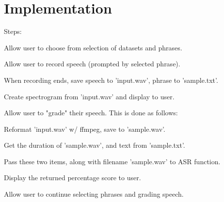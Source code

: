 \documentclass[12pt, letterpaper]{article}
\begin{document}
\section*{Implementation}
Steps:

Allow user to choose from selection of datasets and phrases.

Allow user to record speech (prompted by selected phrase).

When recording ends, save speech to 'input.wav', phrase to 'sample.txt'.

Create spectrogram from 'input.wav' and display to user.

Allow user to "grade" their speech. This is done as follows:

Reformat 'input.wav' w/ ffmpeg, save to 'sample.wav'.

Get the duration of 'sample.wav', and text from 'sample.txt'.

Pass these two items, along with filename 'sample.wav' to ASR function.

Display the returned percentage score to user.

Allow user to continue selecting phrases and grading speech.
\end{document}
